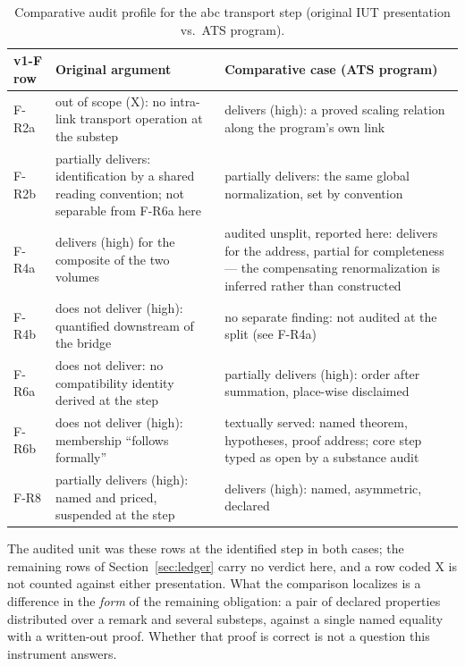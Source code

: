\documentclass[11pt,a4paper]{article}
\begin{document}
\begin{table}[htbp]
\centering
\small
\caption{Comparative audit profile for the abc transport step (original IUT presentation vs.\ ATS program).}
\label{tab:abc_ats_comparison}
\begin{tabularx}{\textwidth}{@{}l X X@{}}
\toprule
v1-F row & Original argument & Comparative case (ATS program) \\
\midrule
F-R2a & out of scope (X): no intra-link transport operation at the substep
   & delivers (high): a proved scaling relation along the program's own
     link \\
F-R2b & partially delivers: identification by a shared reading convention;
     not separable from F-R6a here
   & partially delivers: the same global normalization, set by convention \\
F-R4a & delivers (high) for the composite of the two volumes
   & audited unsplit, reported here: delivers for the address, partial for
     completeness --- the compensating renormalization is inferred rather than
     constructed \\
F-R4b & does not deliver (high): quantified downstream of the bridge
   & no separate finding: not audited at the split (see F-R4a) \\
F-R6a & does not deliver: no compatibility identity derived at the step
   & partially delivers (high): order after summation, place-wise
     disclaimed \\
F-R6b & does not deliver (high): membership ``follows formally''
   & textually served: named theorem, hypotheses, proof address; core step
     typed as open by a substance audit \\
F-R8 & partially delivers (high): named and priced, suspended at the step
   & delivers (high): named, asymmetric, declared \\
\bottomrule
\end{tabularx}
\end{table}

\noindent
The audited unit was these rows at the identified step in both cases; the
remaining rows of Section~\ref{sec:ledger} carry no verdict here, and a row
coded X is not counted against either presentation. What the comparison
localizes is a difference in the \emph{form} of the remaining obligation: a pair
of declared properties distributed over a remark and several substeps, against a
single named equality with a written-out proof. Whether that proof is correct is
not a question this instrument answers.
\end{document}
